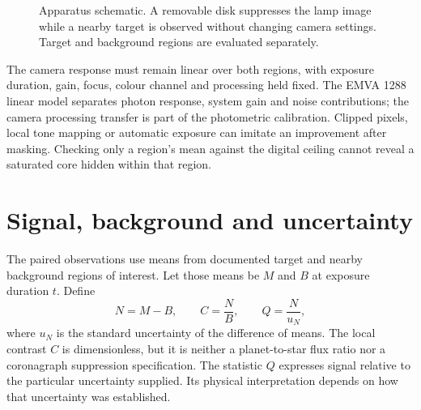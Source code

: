 \begin{figure}[t]
\centering
{}
\caption{Apparatus schematic. A removable disk suppresses the lamp image while a nearby target is observed without changing camera settings. Target and background regions are evaluated separately.}
\label{fig:coronagraph-contrast-apparatus}
\end{figure}

The camera response must remain linear over both regions, with exposure duration, gain, focus, colour channel and processing held fixed. The EMVA 1288 linear model separates photon response, system gain and noise contributions\cite{emva2021}; the camera processing transfer is part of the photometric calibration. Clipped pixels, local tone mapping or automatic exposure can imitate an improvement after masking. Checking only a region's mean against the digital ceiling cannot reveal a saturated core hidden within that region.

\section{Signal, background and uncertainty}
The paired observations use means from documented target and nearby background regions of interest. Let those means be $M$ and $B$ at exposure duration $t$. Define
\begin{equation}
 N=M-B,\qquad C=\frac{N}{B},\qquad Q=\frac{N}{u_N},
 \label{eq:coronagraph-contrast-metrics}
\end{equation}
where $u_N$ is the standard uncertainty of the difference of means. The local contrast $C$ is dimensionless, but it is neither a planet-to-star flux ratio nor a coronagraph suppression specification. The statistic $Q$ expresses signal relative to the particular uncertainty supplied. Its physical interpretation depends on how that uncertainty was established.

